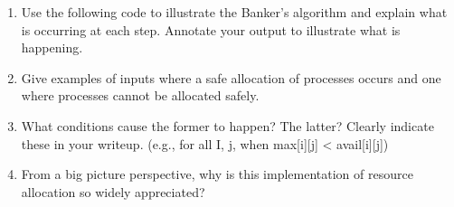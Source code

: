 \documentclass[11pt]{article}
\begin{document}
\begin{enumerate}

\item Use the following code to illustrate the Banker’s algorithm and explain what is occurring at each step. Annotate your output to illustrate what is happening.

\item Give examples of inputs where a safe allocation of processes occurs and one where processes cannot be allocated safely.

\item What conditions cause the former to happen? The latter? Clearly indicate these in your writeup. (e.g., for all I, j, when max[i][j] < avail[i][j])

\item From a big picture perspective, why is this implementation of resource allocation so widely appreciated?

\end{enumerate}
\end{document}
